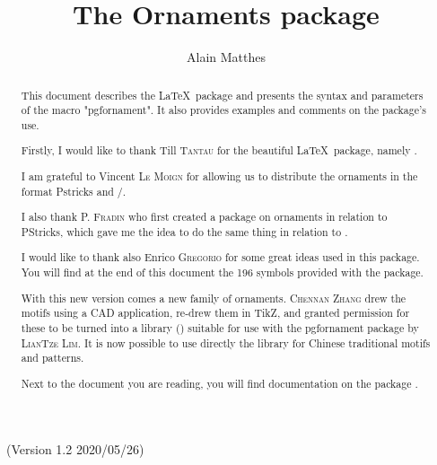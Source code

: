 \documentclass[a4paper,nofonts]{tufte-handout}
\title{The Ornaments package}
\author{Alain Matthes}
\begin{document}
\maketitle
\noindent{}
\begin{marginfigure}
\end{marginfigure}


\bigskip
\noindent{}\ (Version  1.2 2020/05/26)
\begin{abstract}

This document describes the \LaTeX\ package \emph{} and presents the syntax and parameters of the macro "pgfornament".
It also provides examples and comments on the package's use.

 Firstly, I would like to thank {Till \textsc{Tantau}} for the  beautiful \LaTeX\ package, namely \TIKZ.

I am grateful to  Vincent \textsc{Le Moign} for allowing us to distribute the ornaments  in the format Pstricks and \PGF/\TIKZ.

I also thank \textsc{P. Fradin} who first created a package on ornaments in relation to PStricks, which gave me the idea to do the same thing in relation to \TIKZ.

I would like to thank also {Enrico  \textsc{Gregorio}} for some great ideas used in this package. You will find at the end of this document the 196 symbols provided with the package.

With this new version comes a new family of ornaments.
\textsc{Chennan Zhang} drew the motifs using a CAD application, re-drew them in TikZ, and granted permission for these to be turned into a library (\emph{}) suitable for use with the pgfornament package by \textsc{LianTze Lim}.
It is now possible to use directly the library for Chinese traditional motifs and patterns.

Next to the document you are reading, you will find documentation on the package \emph{}.
\end{abstract}

\vspace{1cm}
\hfil  {}\hfil
\end{document}
